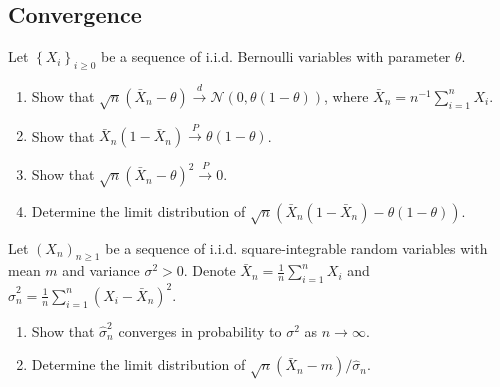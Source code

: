 \begin{center}
    \section*{Convergence}
\end{center}

\begin{Exercise}
Let $\left\{X_{i}\right\}_{i \geq 0}$ be a sequence of i.i.d. Bernoulli variables with parameter $\theta$.

\begin{enumerate}
  \item Show that $\sqrt{n}\left(\bar{X}_{n}-\theta\right) \stackrel{d}{\longrightarrow} \mathcal{N}(0, \theta(1-\theta))$, where $\bar{X}_{n}=n^{-1} \sum_{i=1}^{n} X_{i}$.

  \item Show that $\bar{X}_{n}\left(1-\bar{X}_{n}\right) \stackrel{P}{\longrightarrow} \theta(1-\theta)$.

  \item Show that $\sqrt{n}\left(\bar{X}_{n}-\theta\right)^{2} \stackrel{P}{\longrightarrow} 0$.

  \item Determine the limit distribution of $\sqrt{n}\left(\bar{X}_{n}\left(1-\bar{X}_{n}\right)-\theta(1-\theta)\right)$.

\end{enumerate}
\end{Exercise}

\begin{Exercise}
     Let $\left(X_{n}\right)_{n \geq 1}$ be a sequence of i.i.d. square-integrable random variables with mean $m$ and variance $\sigma^{2}>0$. Denote $\bar{X}_{n}=\frac{1}{n} \sum_{i=1}^{n} X_{i}$ and $\hat{\sigma}_{n}^{2}=\frac{1}{n} \sum_{i=1}^{n}\left(X_{i}-\bar{X}_{n}\right)^{2}$.

\begin{enumerate}
  \item Show that $\hat{\sigma}_{n}^{2}$ converges in probability to $\sigma^{2}$ as $n \rightarrow \infty$.

  \item Determine the limit distribution of $\sqrt{n}\left(\bar{X}_{n}-m\right) / \hat{\sigma}_{n}$.

\end{enumerate}
\end{Exercise}


